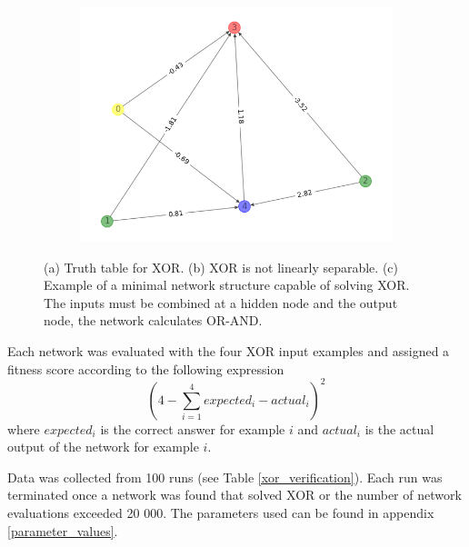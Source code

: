 \begin{figure}[h!]
    \begin{mdframed}
    \begin{subfigure}[t]{0.3\textwidth}
        
        \caption{}
    \end{subfigure}
    \begin{subfigure}[t]{0.3\textwidth}
        
        \caption{}
    \end{subfigure}
    \begin{subfigure}[t]{0.4\textwidth}
        \includegraphics[scale=0.3]{resources/tex/xor/xor_weights.png}
        \caption{}
    \end{subfigure}
    \end{mdframed}
    \caption{(a) Truth table for XOR. (b) XOR is not linearly separable.
    (c) Example of a minimal network structure capable of solving XOR. The inputs must be combined at a hidden node
    and the output node, the network calculates OR-AND.}
    \label{xor}
\end{figure}


Each network was evaluated with the four XOR input examples and assigned a fitness score according to the following expression
\begin{equation*} \label{eq:2}
    (4 - \sum_{i=1}^{4} expected_{i} - actual_{i})^2
\end{equation*}
where $expected_{i}$ is the correct answer for example $i$ and $actual_{i}$ is the actual output of the network for example $i$.

Data was collected from 100 runs (see Table \ref{xor_verification}). Each run was terminated once a network was found that solved
XOR or the number of network evaluations exceeded 20 000. The parameters used can be found in appendix \ref{parameter_values}.

